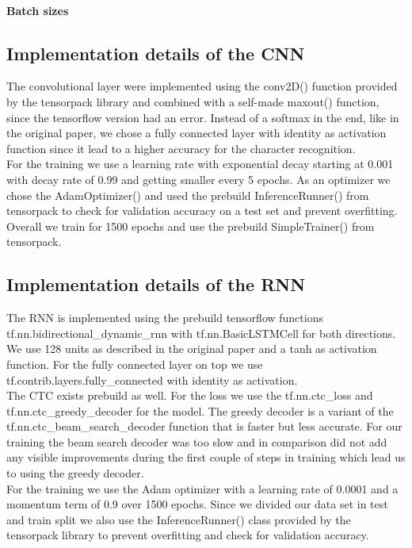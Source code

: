 \documentclass{utue} %
\begin{document}
\paragraph{Batch sizes}
\subsection{Implementation details of the CNN}
The convolutional layer were implemented using the conv2D() function provided by the tensorpack library and combined with a self-made maxout() function, since the tensorflow version had an error. Instead of a softmax in the end, like in the original paper, we chose a fully connected layer with identity as activation function since it lead to a higher accuracy for the character recognition. \\
For the training we use a learning rate with exponential decay starting at 0.001 with decay rate of 0.99 and getting smaller every 5 epochs. As an optimizer we chose the AdamOptimizer() and used the prebuild InferenceRunner() from tensorpack to check for validation accuracy on a test set and prevent overfitting. Overall we train for 1500 epochs and use the prebuild SimpleTrainer() from tensorpack. 

\subsection{Implementation details of the RNN}
The RNN is implemented using the prebuild tensorflow functions tf.nn.bidirectional\_dynamic\_rnn with tf.nn.BasicLSTMCell for both directions. We use 128 units as described in the original paper and a tanh as activation function. For the fully connected layer on top we use tf.contrib.layers.fully\_connected with identity as activation. \\
The CTC exists prebuild as well. For the loss we use the tf.nn.ctc\_loss and tf.nn.ctc\_greedy\_decoder for the model. The greedy decoder is a variant of the tf.nn.ctc\_beam\_search\_decoder function that is faster but less accurate. For our training the beam search decoder was too slow and in comparison did not add any visible improvements during the first couple of steps in training which lead us to using the greedy decoder.  \\
For the training we use the Adam optimizer with a learning rate of 0.0001 and a momentum term of 0.9 over 1500 epochs. Since we divided our data set in test and train split we also use the InferenceRunner() class provided by the tensorpack library to prevent overfitting and check for validation accuracy. 
\end{document}
